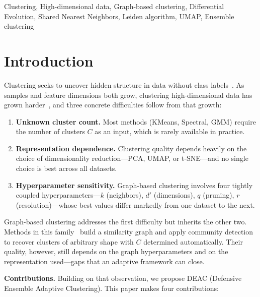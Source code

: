 \documentclass[conference]{IEEEtran}
\begin{document}
\begin{IEEEkeywords}
Clustering, High-dimensional data, Graph-based clustering, Differential Evolution, Shared Nearest Neighbors, Leiden algorithm, UMAP, Ensemble clustering
\end{IEEEkeywords}

\section{Introduction}

Clustering seeks to uncover hidden structure in data without class labels~\cite{jain2010data}. As samples and feature dimensions both grow, clustering high-dimensional data has grown harder~\cite{steinbach2004challenges}, and three concrete difficulties follow from that growth:

\begin{enumerate}
\item \textbf{Unknown cluster count.} Most methods (KMeans, Spectral, GMM) require the number of clusters $C$ as an input, which is rarely available in practice.
\item \textbf{Representation dependence.} Clustering quality depends heavily on the choice of dimensionality reduction---PCA, UMAP, or t-SNE---and no single choice is best across all datasets.
\item \textbf{Hyperparameter sensitivity.} Graph-based clustering involves four tightly coupled hyperparameters---$k$ (neighbors), $d'$ (dimensions), $q$ (pruning), $r$ (resolution)---whose best values differ markedly from one dataset to the next.
\end{enumerate}

Graph-based clustering addresses the first difficulty but inherits the other two. Methods in this family~\cite{schaeffer2007graph} build a similarity graph and apply community detection~\cite{blondel2008fast,traag2019louvain} to recover clusters of arbitrary shape with $C$ determined automatically. Their quality, however, still depends on the graph hyperparameters and on the representation used---gaps that an adaptive framework can close.

\textbf{Contributions.} Building on that observation, we propose DEAC (Defensive Ensemble Adaptive Clustering). This paper makes four contributions:
\end{document}
